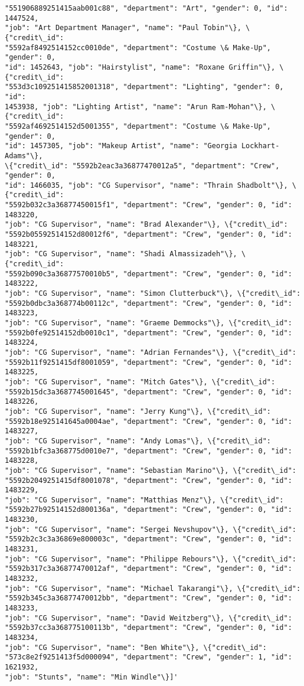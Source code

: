 \documentclass[11pt]{article}
\begin{document}
\begin{tcolorbox}[breakable, size=fbox, boxrule=.5pt, pad at break*=1mm, opacityfill=0]
\begin{Verbatim}[commandchars=\\\{\}]
"551906889251415aab001c88", "department": "Art", "gender": 0, "id": 1447524,
"job": "Art Department Manager", "name": "Paul Tobin"\}, \{"credit\_id":
"5592af8492514152cc0010de", "department": "Costume \& Make-Up", "gender": 0,
"id": 1452643, "job": "Hairstylist", "name": "Roxane Griffin"\}, \{"credit\_id":
"553d3c109251415852001318", "department": "Lighting", "gender": 0, "id":
1453938, "job": "Lighting Artist", "name": "Arun Ram-Mohan"\}, \{"credit\_id":
"5592af4692514152d5001355", "department": "Costume \& Make-Up", "gender": 0,
"id": 1457305, "job": "Makeup Artist", "name": "Georgia Lockhart-Adams"\},
\{"credit\_id": "5592b2eac3a36877470012a5", "department": "Crew", "gender": 0,
"id": 1466035, "job": "CG Supervisor", "name": "Thrain Shadbolt"\}, \{"credit\_id":
"5592b032c3a36877450015f1", "department": "Crew", "gender": 0, "id": 1483220,
"job": "CG Supervisor", "name": "Brad Alexander"\}, \{"credit\_id":
"5592b05592514152d80012f6", "department": "Crew", "gender": 0, "id": 1483221,
"job": "CG Supervisor", "name": "Shadi Almassizadeh"\}, \{"credit\_id":
"5592b090c3a36877570010b5", "department": "Crew", "gender": 0, "id": 1483222,
"job": "CG Supervisor", "name": "Simon Clutterbuck"\}, \{"credit\_id":
"5592b0dbc3a368774b00112c", "department": "Crew", "gender": 0, "id": 1483223,
"job": "CG Supervisor", "name": "Graeme Demmocks"\}, \{"credit\_id":
"5592b0fe92514152db0010c1", "department": "Crew", "gender": 0, "id": 1483224,
"job": "CG Supervisor", "name": "Adrian Fernandes"\}, \{"credit\_id":
"5592b11f9251415df8001059", "department": "Crew", "gender": 0, "id": 1483225,
"job": "CG Supervisor", "name": "Mitch Gates"\}, \{"credit\_id":
"5592b15dc3a3687745001645", "department": "Crew", "gender": 0, "id": 1483226,
"job": "CG Supervisor", "name": "Jerry Kung"\}, \{"credit\_id":
"5592b18e925141645a0004ae", "department": "Crew", "gender": 0, "id": 1483227,
"job": "CG Supervisor", "name": "Andy Lomas"\}, \{"credit\_id":
"5592b1bfc3a368775d0010e7", "department": "Crew", "gender": 0, "id": 1483228,
"job": "CG Supervisor", "name": "Sebastian Marino"\}, \{"credit\_id":
"5592b2049251415df8001078", "department": "Crew", "gender": 0, "id": 1483229,
"job": "CG Supervisor", "name": "Matthias Menz"\}, \{"credit\_id":
"5592b27b92514152d800136a", "department": "Crew", "gender": 0, "id": 1483230,
"job": "CG Supervisor", "name": "Sergei Nevshupov"\}, \{"credit\_id":
"5592b2c3c3a36869e800003c", "department": "Crew", "gender": 0, "id": 1483231,
"job": "CG Supervisor", "name": "Philippe Rebours"\}, \{"credit\_id":
"5592b317c3a36877470012af", "department": "Crew", "gender": 0, "id": 1483232,
"job": "CG Supervisor", "name": "Michael Takarangi"\}, \{"credit\_id":
"5592b345c3a36877470012bb", "department": "Crew", "gender": 0, "id": 1483233,
"job": "CG Supervisor", "name": "David Weitzberg"\}, \{"credit\_id":
"5592b37cc3a368775100113b", "department": "Crew", "gender": 0, "id": 1483234,
"job": "CG Supervisor", "name": "Ben White"\}, \{"credit\_id":
"573c8e2f9251413f5d000094", "department": "Crew", "gender": 1, "id": 1621932,
"job": "Stunts", "name": "Min Windle"\}]'
\end{Verbatim}
\end{tcolorbox}
        
\end{document}
